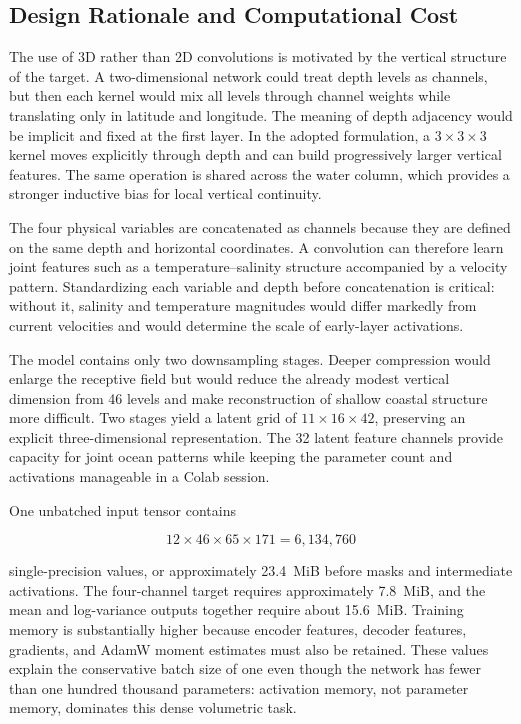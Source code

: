 \subsection{Design Rationale and Computational Cost}

The use of 3D rather than 2D convolutions is motivated by the vertical structure of the target. A two-dimensional network could treat depth levels as channels, but then each kernel would mix all levels through channel weights while translating only in latitude and longitude. The meaning of depth adjacency would be implicit and fixed at the first layer. In the adopted formulation, a $3\times3\times3$ kernel moves explicitly through depth and can build progressively larger vertical features. The same operation is shared across the water column, which provides a stronger inductive bias for local vertical continuity.

The four physical variables are concatenated as channels because they are defined on the same depth and horizontal coordinates. A convolution can therefore learn joint features such as a temperature--salinity structure accompanied by a velocity pattern. Standardizing each variable and depth before concatenation is critical: without it, salinity and temperature magnitudes would differ markedly from current velocities and would determine the scale of early-layer activations.

The model contains only two downsampling stages. Deeper compression would enlarge the receptive field but would reduce the already modest vertical dimension from 46 levels and make reconstruction of shallow coastal structure more difficult. Two stages yield a latent grid of $11\times16\times42$, preserving an explicit three-dimensional representation. The 32 latent feature channels provide capacity for joint ocean patterns while keeping the parameter count and activations manageable in a Colab session.

One unbatched input tensor contains

\[
12\times46\times65\times171=6{,}134{,}760
\]

single-precision values, or approximately 23.4~MiB before masks and intermediate activations. The four-channel target requires approximately 7.8~MiB, and the mean and log-variance outputs together require about 15.6~MiB. Training memory is substantially higher because encoder features, decoder features, gradients, and AdamW moment estimates must also be retained. These values explain the conservative batch size of one even though the network has fewer than one hundred thousand parameters: activation memory, not parameter memory, dominates this dense volumetric task.

